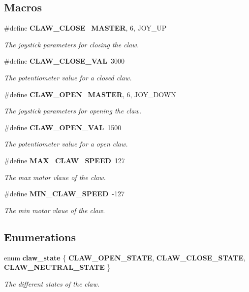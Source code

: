 \subsection*{Macros}
\begin{DoxyCompactItemize}
\item 
\#define \textbf{ C\+L\+A\+W\+\_\+\+C\+L\+O\+SE}~\textbf{ M\+A\+S\+T\+ER}, 6, J\+O\+Y\+\_\+\+UP
\begin{DoxyCompactList}\small\item\em The joystick parameters for closing the claw. \end{DoxyCompactList}\item 
\#define \textbf{ C\+L\+A\+W\+\_\+\+C\+L\+O\+S\+E\+\_\+\+V\+AL}~3000
\begin{DoxyCompactList}\small\item\em The potentiometer value for a closed claw. \end{DoxyCompactList}\item 
\#define \textbf{ C\+L\+A\+W\+\_\+\+O\+P\+EN}~\textbf{ M\+A\+S\+T\+ER}, 6, J\+O\+Y\+\_\+\+D\+O\+WN
\begin{DoxyCompactList}\small\item\em The joystick parameters for opening the claw. \end{DoxyCompactList}\item 
\#define \textbf{ C\+L\+A\+W\+\_\+\+O\+P\+E\+N\+\_\+\+V\+AL}~1500
\begin{DoxyCompactList}\small\item\em The potentiometer value for a open claw. \end{DoxyCompactList}\item 
\#define \textbf{ M\+A\+X\+\_\+\+C\+L\+A\+W\+\_\+\+S\+P\+E\+ED}~127
\begin{DoxyCompactList}\small\item\em The max motor vlaue of the claw. \end{DoxyCompactList}\item 
\#define \textbf{ M\+I\+N\+\_\+\+C\+L\+A\+W\+\_\+\+S\+P\+E\+ED}~-\/127
\begin{DoxyCompactList}\small\item\em The min motor vlaue of the claw. \end{DoxyCompactList}\end{DoxyCompactItemize}
\subsection*{Enumerations}
\begin{DoxyCompactItemize}
\item 
enum \textbf{ claw\+\_\+state} \{ \textbf{ C\+L\+A\+W\+\_\+\+O\+P\+E\+N\+\_\+\+S\+T\+A\+TE}, 
\textbf{ C\+L\+A\+W\+\_\+\+C\+L\+O\+S\+E\+\_\+\+S\+T\+A\+TE}, 
\textbf{ C\+L\+A\+W\+\_\+\+N\+E\+U\+T\+R\+A\+L\+\_\+\+S\+T\+A\+TE}
 \}\begin{DoxyCompactList}\small\item\em The different states of the claw. \end{DoxyCompactList}
\end{DoxyCompactItemize}
